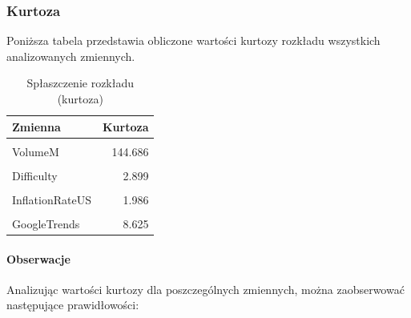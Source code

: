 \documentclass[
  11pt,
]{article}
\begin{document}
\pagebreak

\subsubsection{Kurtoza}\label{kurtoza}

Poniższa tabela przedstawia obliczone wartości kurtozy rozkładu
wszystkich analizowanych zmiennych.

\begin{table}[!h]
\centering
\caption{\label{tab:unnamed-chunk-4}Spłaszczenie rozkładu (kurtoza)}
\centering
\begin{tabular}[t]{lr}
\toprule
Zmienna & Kurtoza\\
\midrule
\cellcolor{gray!10}{Price} & \cellcolor{gray!10}{2.152}\\
VolumeM & 144.686\\
\cellcolor{gray!10}{USAvgKWHPrice} & \cellcolor{gray!10}{0.158}\\
Difficulty & 2.899\\
\cellcolor{gray!10}{BTCCirculation} & \cellcolor{gray!10}{-0.081}\\
\addlinespace
InflationRateUS & 1.986\\
\cellcolor{gray!10}{HasMuskMentioned} & \cellcolor{gray!10}{30.485}\\
GoogleTrends & 8.625\\
\bottomrule
\end{tabular}
\end{table}

\paragraph{\texorpdfstring{Obserwacje
\newline}{Obserwacje }}\label{obserwacje-2}

Analizując wartości kurtozy dla poszczególnych zmiennych, można
zaobserwować następujące prawidłowości:
\end{document}
